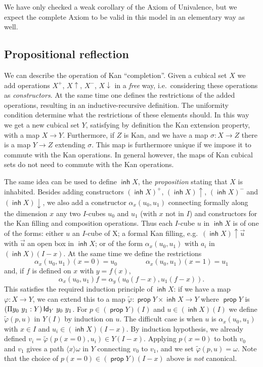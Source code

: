 \documentclass[10pt,a4paper]{article}
\DeclareMathOperator{\inh}{\mathsf{inh}}
\DeclareMathOperator{\prop}{\mathsf{prop}}
\newcommand{\Id}{{\sf Id}}
\newcommand{\rup}[1]{#1{\uparrow}}
\newcommand{\bind}[2]{{\langle}#1{\rangle}#2}
\begin{document}
\medskip

 We have only checked a weak corollary of the Axiom of Univalence, but we expect the complete Axiom to be valid
in this model in an elementary way as well.


\subsection{Propositional reflection}

We can describe the operation of Kan ``completion''. Given a cubical
set $X$ we add operations $X^+$, $X\uparrow$, $X^-$, $X\downarrow$ in
a {\em free} way, i.e.\ considering these operations as {\em
  constructors}.  At the same time one defines the restrictions of the
added operations, resulting in an inductive-recursive definition.  The
uniformity condition determine what the restrictions of these elements
should.  In this way we get a new cubical set $Y$, satisfying by
definition the Kan extension property, with a map $X \to Y$.
Furthermore, if $Z$ is Kan, and we have a map $\sigma:X\to Z$ there is
a map $Y\to Z$ extending $\sigma$.  This map is furthermore unique if
we impose it to commute with the Kan operations.  In general however,
the maps of Kan cubical sets do not need to commute with the Kan
operations.

The same idea can be used to define $\inh X$, the {\em proposition}
stating that $X$ is inhabited.  Besides adding constructors $(\inh
X)^+$, $(\inh X)\uparrow$, $(\inh X)^-$ and $(\inh X)\downarrow$, we
also add a constructor $\alpha_x(u_0,u_1)$ connecting formally along
the dimension $x$ any two $I$-cubes $u_0$ and $u_1$ (with $x$ not in
$I$) and constructors for the Kan filling and composition operations.
Thus each $I$-cube $u$ in $\inh X$ is of one of the forms: either $u$
an $I$-cube of X; a formal Kan filling, e.g.\ $\rup {(\inh X)} {\vec
  u}$ with $\vec u$ an open box in $\inh X$; or of the form
$\alpha_x(u_0,u_1)$ with $a_i$ in $(\inh X) (I-x)$.  At the same time
we define the restrictions
\[
\alpha_x(u_0,u_1)(x=0) = u_0 \qquad \qquad \alpha_x(u_0,u_1)(x=1) =
u_1
\]
and, if $f$ is defined on $x$ with $y=f(x)$,
\[
\alpha_x(u_0,u_1)f = \alpha_y(u_0(f-x),u_1(f-x)).
\]
This satisfies the required induction principle of $\inh X$: if we
have a map $\varphi : X \to Y$, we can extend this to a map
$\tilde\varphi : \prop Y \times \inh X \to Y$ where $\prop Y$ is $(\Pi
y_0~y_1 : Y) \, \Id_Y~y_0~y_1$.  For $p \in(\prop Y) (I)$ and $u \in
(\inh X) (I)$ we define $\tilde\varphi (p,u)$ in $Y (I)$ by induction
on $u$.  The difficult case is when $u$ is $\alpha_x (u_0, u_1)$ with
$x \in I$ and $u_i \in (\inh X) (I-x)$.  By induction hypothesis, we
already defined $v_i = \tilde\varphi (p (x = 0), u_i) \in Y (I-x)$.
Applying $p (x=0)$ to both $v_0$ and $v_1$ gives a path $\bind x
\omega$ in $Y$ connecting $v_0$ to $v_1$, and we set $\tilde\varphi
(p,u) = \omega$.  Note that the choice of $p (x = 0) \in (\prop Y)
(I-x)$ above is \emph{not} canonical.
\end{document}
